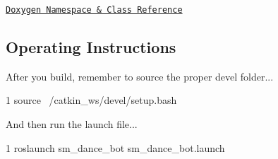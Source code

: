 \href{https://reelrbtx.github.io/SMACC/master/html/namespacesm__dance__bot.html}{\tt Doxygen Namespace \& Class Reference}

\subsection*{Operating Instructions}

After you build, remember to source the proper devel folder...


\begin{DoxyCode}
1 source ~/catkin\_ws/devel/setup.bash
\end{DoxyCode}


And then run the launch file...


\begin{DoxyCode}
1 roslaunch sm\_dance\_bot sm\_dance\_bot.launch
\end{DoxyCode}
 